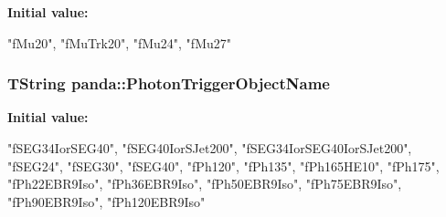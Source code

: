 \label{namespacepanda_ab0aef64e5845b73e1072a7ed38cfd5c2}
{\bfseries Initial value:}
\begin{DoxyCode}
 {
  "fMu20",
  "fMuTrk20",
  "fMu24",
  "fMu27"
}
\end{DoxyCode}
\hypertarget{namespacepanda_a323f460e44dbf9eba1f06cfc4186dc99}{
\subsubsection[{PhotonTriggerObjectName}]{\setlength{\rightskip}{0pt plus 5cm}TString {\bf panda::PhotonTriggerObjectName}}}
\label{namespacepanda_a323f460e44dbf9eba1f06cfc4186dc99}
{\bfseries Initial value:}
\begin{DoxyCode}
 {
  "fSEG34IorSEG40",
  "fSEG40IorSJet200",
  "fSEG34IorSEG40IorSJet200",
  "fSEG24",
  "fSEG30",
  "fSEG40",
  "fPh120",
  "fPh135",
  "fPh165HE10",
  "fPh175",
  "fPh22EBR9Iso",
  "fPh36EBR9Iso",
  "fPh50EBR9Iso",
  "fPh75EBR9Iso",
  "fPh90EBR9Iso",
  "fPh120EBR9Iso"
}
\end{DoxyCode}
